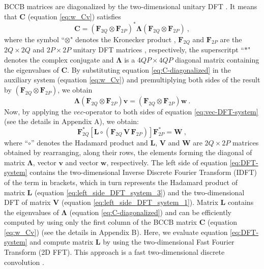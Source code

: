 BCCB matrices are diagonalized by the two-dimensional unitary DFT 
\citep[][ p. 185]{davis1979}. It means that $\mathbf{C}$ (equation \ref{eq:w_Cv}) 
satisfies 
\begin{equation}
\mathbf{C} = 
\left(\mathbf{F}_{2Q} \otimes \mathbf{F}_{2P} \right)^{\ast} 
\boldsymbol{\Lambda}
\left(\mathbf{F}_{2Q} \otimes \mathbf{F}_{2P} \right) \: ,
\label{eq:C-diagonalized}
\end{equation}
where the symbol ``$\otimes$" denotes the Kronecker product \citep{neudecker1969},
$\mathbf{F}_{2Q}$ and $\mathbf{F}_{2P}$ are the $2Q \times 2Q$ and $2P \times 2P$ 
unitary DFT matrices \citep[][ p. 31]{davis1979}, respectively, the superscritpt 
``$\ast$" denotes the complex conjugate and $\boldsymbol{\Lambda}$ is a 
$4QP \times 4QP$ diagonal matrix containing the eigenvalues of $\mathbf{C}$.
By substituting equation \ref{eq:C-diagonalized} in the auxiliary system 
(equation \ref{eq:w_Cv}) and premultiplying both
sides of the result by $\left(\mathbf{F}_{2Q} \otimes \mathbf{F}_{2P} \right)$, 
we obtain
\begin{equation}
\boldsymbol{\Lambda} \left(\mathbf{F}_{2Q} \otimes \mathbf{F}_{2P} \right) 
\mathbf{v} = \left(\mathbf{F}_{2Q} \otimes \mathbf{F}_{2P} \right) 
\mathbf{w} \: .
\label{eq:vec-DFT-system}
\end{equation}
Now, by applying the $vec$-operator to both sides of equation \ref{eq:vec-DFT-system} 
(see the details in Appendix A), we obtain:
\begin{equation}
\mathbf{F}_{2Q}^{\ast} \left[ 
\mathbf{L} \circ \left(\mathbf{F}_{2Q} \, \mathbf{V} \, \mathbf{F}_{2P} \right) 
\right] \mathbf{F}_{2P}^{\ast} = \mathbf{W} \: ,
\label{eq:DFT-system}
\end{equation}
where ``$\circ$'' denotes the Hadamard product \citep[][ p. 298]{horn_johnson1991} and 
$\mathbf{L}$, $\mathbf{V}$ and $\mathbf{W}$ are $2Q \times 2P$ matrices obtained 
by rearranging, along their rows, the elements forming the diagonal of matrix 
$\boldsymbol{\Lambda}$, vector $\mathbf{v}$ and vector $\mathbf{w}$, respectively.
The left side of equation \ref{eq:DFT-system} contains the two-dimensional 
Inverse Discrete Fourier Transform (IDFT) of the term in brackets, which in turn
represents the Hadamard product of matrix $\mathbf{L}$ (equation \ref{eq:left_side_DFT_system_3})
and the two-dimensional DFT of matrix $\mathbf{V}$ (equation \ref{eq:left_side_DFT_system_1}).
Matrix $\mathbf{L}$ contains the eigenvalues 
of $\boldsymbol{\Lambda}$ (equation \ref{eq:C-diagonalized}) and can be 
efficiently computed by using only the first column of the BCCB matrix 
$\mathbf{C}$ (equation \ref{eq:w_Cv}) (see the details in Appendix B).
Here, we evaluate equation \ref{eq:DFT-system} and compute matrix $\mathbf{L}$
by using the two-dimensional Fast Fourier Transform (2D FFT).
This approach is a fast two-dimensional discrete convolution \citep[e.g.,][ p. 213]{vanloan1992}.

